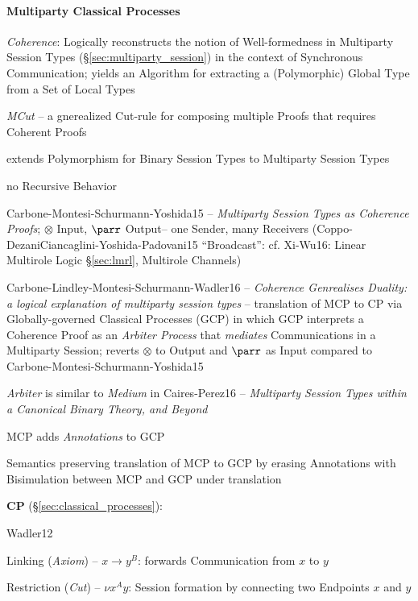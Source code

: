 \paragraph{Multiparty Classical Processes}\label{sec:mcp}\hfill

\emph{Coherence}: Logically reconstructs the notion of Well-formedness
in Multiparty Session Types (\S\ref{sec:multiparty_session}) in the
context of Synchronous Communication; yields an Algorithm for
extracting a (Polymorphic) Global Type from a Set of Local Types

\emph{MCut} -- a gnerealized Cut-rule for composing multiple Proofs
that requires Coherent Proofs

extends Polymorphism for Binary Session Types to Multiparty Session
Types

no Recursive Behavior

Carbone-Montesi-Schurmann-Yoshida15 -- \emph{Multiparty Session Types
  as Coherence Proofs}; $\otimes$ Input, $\parr$ Output-- one Sender,
many Receivers (Coppo-DezaniCiancaglini-Yoshida-Padovani15
``Broadcast'': cf. Xi-Wu16: Linear Multirole Logic \S\ref{sec:lmrl},
Multirole Channels)

Carbone-Lindley-Montesi-Schurmann-Wadler16 -- \emph{Coherence
  Genrealises Duality: a logical explanation of multiparty session
  types} -- translation of MCP to CP via Globally-governed Classical
Processes (GCP) in which GCP interprets a Coherence Proof as an
\emph{Arbiter Process} that \emph{mediates} Communications in a
Multiparty Session; reverts $\otimes$ to Output and $\parr$ as Input
compared to Carbone-Montesi-Schurmann-Yoshida15

\emph{Arbiter} is similar to \emph{Medium} in Caires-Perez16 --
\emph{Multiparty Session Types within a Canonical Binary Theory, and
  Beyond}

MCP adds \emph{Annotations} to GCP

Semantics preserving translation of MCP to GCP by erasing Annotations
with Bisimulation between MCP and GCP under translation


\textbf{CP} (\S\ref{sec:classical_processes}):

Wadler12


Linking (\emph{Axiom}) -- $x \rightarrow y^B$: forwards Communication
from $x$ to $y$

Restriction (\emph{Cut}) -- $\nu x^A y$: Session formation by
connecting two Endpoints $x$ and $y$

